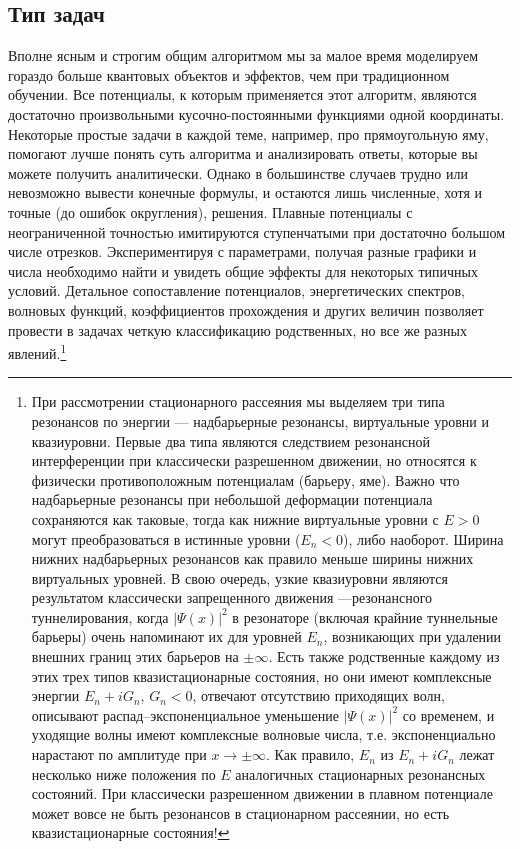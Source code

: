 \documentclass[12pt]{article}
\begin{document}
\hypertarget{purpose1}{}\subsection{Тип задач}
Вполне ясным и строгим общим алгоритмом мы
за малое время моделируем гораздо больше квантовых объектов и
эффектов, чем при традиционном обучении. Все потенциалы, к
которым применяется этот алгоритм, являются достаточно
произвольными кусочно-постоянными функциями одной координаты. Некоторые простые задачи в каждой теме, например, про прямоугольную яму, помогают лучше понять
суть алгоритма и анализировать ответы, которые вы можете
получить аналитически. Однако в большинстве случаев
трудно или невозможно вывести конечные формулы, и
остаются лишь численные, хотя и точные (до ошибок округления),
решения. Плавные потенциалы с неограниченной точностью имитируются ступенчатыми при достаточно большом числе отрезков.
Экспериментируя с параметрами, получая разные графики и
числа необходимо найти и увидеть общие эффекты
для некоторых типичных условий. Детальное сопоставление потенциалов, энергетических спектров, волновых функций, коэффициентов прохождения и других величин позволяет провести в задачах четкую классификацию родственных, но все же разных явлений.\footnote[3]{
При рассмотрении стационарного рассеяния мы выделяем три типа резонансов по энергии --- надбарьерные резонансы, виртуальные уровни и квазиуровни. Первые два типа являются следствием резонансной интерференции при классически разрешенном движении, но относятся к физически противоположным потенциалам (барьеру, яме). Важно что надбарьерные резонансы при небольшой деформации потенциала сохраняются как таковые, тогда как нижние виртуальные уровни с $E>0$  могут преобразоваться в истинные уровни ($E_n<0$), либо наоборот. Ширина нижних надбарьерных резонансов как правило меньше ширины нижних виртуальных уровней.  В свою очередь, узкие квазиуровни являются результатом классически запрещенного движения ---резонансного туннелирования,
когда $|\Psi(x)|^2$ в резонаторе (включая крайние туннельные барьеры) очень напоминают их для уровней $E_n$, возникающих при удалении внешних границ этих барьеров на $\pm\infty$.
Есть также родственные каждому из этих трех типов квазистационарные состояния, но они имеют комплексные энергии $E_n+iG_n$, $G_n<0$, отвечают отсутствию приходящих волн, описывают распад--экспоненциальное уменьшение  $|\Psi(x)|^2$ со временем, и уходящие волны имеют комплексные волновые числа, т.е. экспоненциально нарастают по амплитуде при $x\to\pm\infty$. Как правило, $E_n$ из $E_n+iG_n$ лежат несколько ниже положения по $E$ аналогичных стационарных резонансных состояний. При классически разрешенном движении в плавном потенциале может вовсе не быть резонансов в стационарном рассеянии, но есть квазистационарные состояния!}
\end{document}

